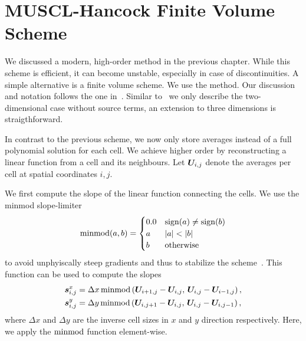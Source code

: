 \section{MUSCL-Hancock Finite Volume Scheme}\label{sec:muscl}
We discussed a modern, high-order \dg{} method in the previous chapter.
While this scheme is efficient, it can become unstable, especially in case of discontinuities.
A simple alternative is a finite volume scheme.
We use the \muscl{} method\cite{vanLeer1979towards}.
Our discussion and notation follows the one in~\cite{toro2009riemann}.
Similar to~\cite{toro2009riemann} we only describe the two-dimensional case without source terms, an extension to three dimensions is straigthforward.

In contrast to the previous \dg{} scheme, we now only store averages instead of a full polynomial solution for each cell.
We achieve higher order by reconstructing a linear function from a cell and its neighbours.
Let $\cellAvg$ denote the averages per cell at spatial coordinates $i,j$.

We first compute the slope of the linear function connecting the cells.
We use the minmod slope-limiter
\begin{equation}
  \label{eq:minmod}
  \minmod(a, b) =
  \begin{cases}
    0.0 & \sign(a) \neq \sign(b) \\
      a & \vert a \vert < \vert b \vert \\
      b & \text{otherwise}
  \end{cases}
\end{equation}
to avoid unphyiscally steep gradients and thus to stabilize the scheme~\cite{leVeque2002finite}.
This function can be used to compute the slopes
\begin{align}\label{eq:slopes}
  \begin{split}
   \slope{x} &=  \Delta x \minmod \left( \cellAvg[i+1,j] - \cellAvg[i,j], \, \cellAvg[i,j] - \cellAvg[i-1, j] \right),\\ 
   \slope{y} &=  \Delta y \minmod \left( \cellAvg[i,j+1] - \cellAvg[i,j], \, \cellAvg[i,j] - \cellAvg[i, j-1] \right),
   \end{split}
\end{align}
where $\Delta x$ and $\Delta y$ are the inverse cell sizes in $x$ and $y$ direction respectively.
Here, we apply the $\minmod$ function element-wise.

